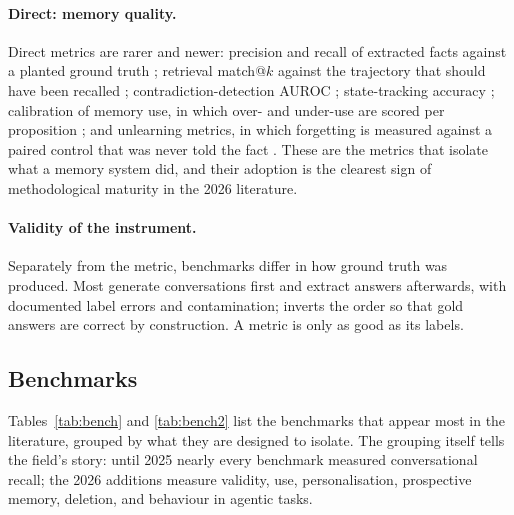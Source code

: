 \documentclass[11pt]{article}
\begin{document}
\paragraph{Direct: memory quality.} Direct metrics are rarer and newer: precision and recall of extracted facts against a planted ground truth \citep{spencer2026groundtruth}; retrieval match@$k$ against the trajectory that should have been recalled \citep{chen2026rem}; contradiction-detection AUROC \citep{yadav2026memstrata}; state-tracking accuracy \citep{fan2026statemem}; calibration of memory use, in which over- and under-use are scored per proposition \citep{cao2026memcalib}; and unlearning metrics, in which forgetting is measured against a paired control that was never told the fact \citep{xie2026bemula}. These are the metrics that isolate what a memory system did, and their adoption is the clearest sign of methodological maturity in the 2026 literature.

\paragraph{Validity of the instrument.} Separately from the metric, benchmarks differ in how ground truth was produced. Most generate conversations first and extract answers afterwards, with documented label errors and contamination; \citet{spencer2026groundtruth} inverts the order so that gold answers are correct by construction. A metric is only as good as its labels.

\subsection{Benchmarks}

Tables~\ref{tab:bench} and \ref{tab:bench2} list the benchmarks that appear most in the literature, grouped by what they are designed to isolate. The grouping itself tells the field's story: until 2025 nearly every benchmark measured conversational recall; the 2026 additions measure validity, use, personalisation, prospective memory, deletion, and behaviour in agentic tasks.
\end{document}

